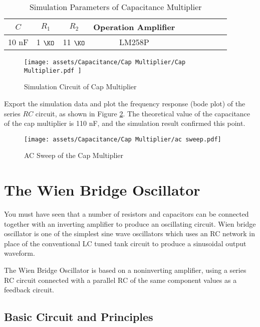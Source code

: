 \documentclass[D:/a_RemoteRepo/GH.LatexNotes/.demo/Analog_Circuits_Handbook.tex]{subfiles}
\begin{document}
\begin{table}[H]\centering
    \caption{Simulation Parameters of Capacitance Multiplier}
    \label{tab: Simulation Parameters of Capacitance Multiplier}
\begin{tabular}{cccccccccc}\toprule
    $C$ & $R_1$ & $R_2$ & Operation Amplifier  \\
    \midrule
    10 nF& 1 $\KO$ & 11 $\KO$ & LM258P  \\
    \bottomrule
\end{tabular}
\end{table}


\begin{figure}[H]\centering
    \texttt{[image: assets/Capacitance/Cap Multiplier/Cap Multiplier.pdf
    ]}
    \caption{Simulation Circuit of Cap Multiplier}
    \label{fig: Simulation Circuit of Cap Multiplier}
\end{figure}

Export the simulation data and plot the frequency response (bode plot) of the series $RC$ circuit, as shown in Figure \ref{fig: AC Sweep of the Cap Multiplier}. The theoretical value of the capacitance of the cap multiplier is 110 nF, and the simulation result confirmed this point.
\begin{figure}[H]\centering
    \texttt{[image: assets/Capacitance/Cap Multiplier/ac sweep.pdf]}
    \caption{AC Sweep of the Cap Multiplier}
    \label{fig: AC Sweep of the Cap Multiplier}
\end{figure}


\section{The Wien Bridge Oscillator}

You must have seen that a number of resistors and capacitors can be connected together with an inverting amplifier to produce an oscillating circuit. Wien bridge oscillator is one of the simplest sine wave oscillators which uses an RC network in place of the conventional LC tuned tank circuit to produce a sinusoidal output waveform.

The Wien Bridge Oscillator is based on a noninverting amplifier, using a series RC circuit connected with a parallel RC of the same component values as a feedback circuit. 

\subsection{Basic Circuit and Principles}
\end{document}
